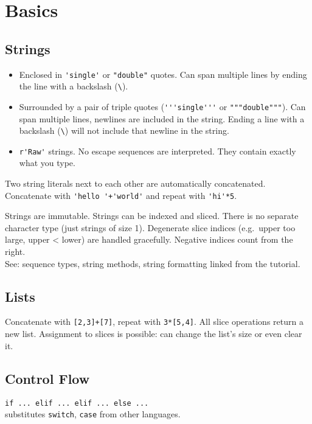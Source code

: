 \section{Basics}


\subsection{Strings}

\begin{itemize}
\item
Enclosed in \verb='single'= or \verb="double"= quotes.
Can span multiple lines by ending the line with a backslash (\verb=\=).

\item
Surrounded by a pair of triple quotes
(\verb='''single'''= or \verb="""double"""=).
Can span multiple lines, newlines are included in the string.
Ending a line with a backslash (\verb=\=)
will not include that newline in the string.

\item
\verb=r'Raw'= strings.
No escape sequences are interpreted.
They contain exactly what you type.
\end{itemize}

Two string literals next to each other are automatically concatenated.
Concatenate with \verb='hello '+'world'= and repeat with \verb='hi'*5=.

Strings are immutable.
Strings can be indexed and sliced.
There is no separate character type (just strings of size 1).
Degenerate slice indices (e.g.\ upper too large, upper < lower)
are handled gracefully.
Negative indices count from the right.\\
See: sequence types, string methods, string formatting
linked from the tutorial.


\subsection{Lists}

Concatenate with \verb=[2,3]+[7]=, repeat with \verb=3*[5,4]=.
All slice operations return a new list.
Assignment to slices is possible: can change the list's size or even clear it.


\subsection{Control Flow}

\verb=if ... elif ... elif ... else ...=\\
substitutes \verb=switch=, \verb=case= from other languages.

